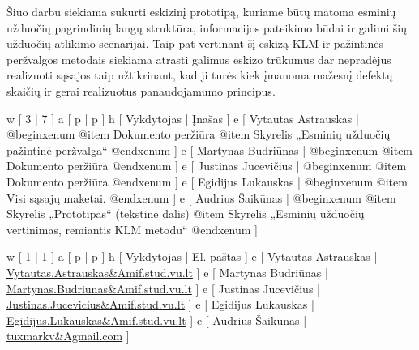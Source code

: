 
Šiuo darbu siekiama sukurti eskizinį prototipą, kuriame būtų matoma
esminių užduočių pagrindinių langų struktūra, informacijos
pateikimo būdai ir galimi šių užduočių atlikimo scenarijai. Taip
pat vertinant šį eskizą KLM ir pažintinės peržvalgos metodais
siekiama atrasti galimus eskizo trūkumus dar nepradėjus realizuoti
sąsajos taip užtikrinant, kad ji turės kiek įmanoma mažesnį
defektų skaičių ir gerai realizuotus panaudojamumo principus.

\xtable
{
  w [ 3  | 7 ]
  a [ p  | p ]
  h [ Vykdytojas | Įnašas ]
  e [ Vytautas Astrauskas
  | @begin{xenum} 
      @item Dokumento peržiūra
      @item Skyrelis „Esminių užduočių pažintinė peržvalga“
    @end{xenum}
  ]
  e [ Martynas Budriūnas
  | @begin{xenum} 
      @item Dokumento peržiūra
    @end{xenum}
  ]
  e [ Justinas Jucevičius 
  | @begin{xenum} 
      @item Dokumento peržiūra
    @end{xenum}
  ]
  e [ Egidijus Lukauskas 
  | @begin{xenum} 
      @item Visi sąsajų maketai.
    @end{xenum}
  ]
  e [ Audrius Šaikūnas 
  | @begin{xenum} 
      @item Skyrelis „Prototipas“ (tekstinė dalis)
      @item Skyrelis „Esminių užduočių vertinimas, remiantis KLM metodu“
    @end{xenum}
  ]
}

\xtableu
{
  w [ 1 | 1 ]
  a [ p | p ]
  h [ Vykdytojas | El. paštas ]
  e [ Vytautas Astrauskas | \url{Vytautas.Astrauskas&Amif.stud.vu.lt} ]
  e [ Martynas Budriūnas  | \url{Martynas.Budriunas&Amif.stud.vu.lt} ]
  e [ Justinas Jucevičius | \url{Justinas.Jucevicius&Amif.stud.vu.lt} ]
  e [ Egidijus Lukauskas  | \url{Egidijus.Lukauskas&Amif.stud.vu.lt} ]
  e [ Audrius Šaikūnas    | \url{tuxmarkv&Agmail.com} ]
}
